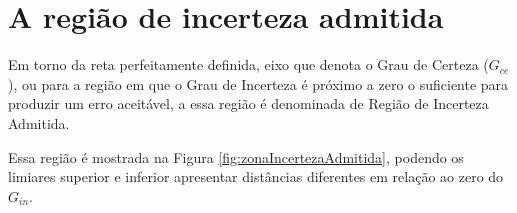 




\section{A região de incerteza  admitida }

Em torno da reta perfeitamente definida,
eixo que denota o Grau de Certeza ($G_{ce}$),
ou para a região em que o Grau de Incerteza é próximo a zero
o suficiente para produzir um erro aceitável,
a essa região é denominada de Região de Incerteza Admitida.

Essa região é mostrada na Figura \ref{fig:zonaIncertezaAdmitida},
podendo os limiares superior e inferior apresentar distâncias diferentes
em relação ao zero do $G_{in}$. 


